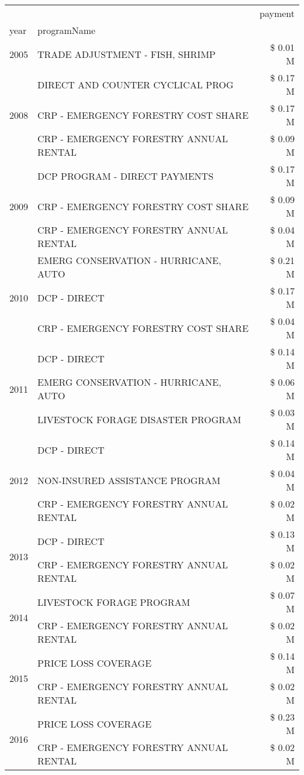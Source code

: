 \begin{tabular}{llr}
\toprule
 &  & payment \\
year & programName &  \\
\midrule
2005 & TRADE ADJUSTMENT - FISH, SHRIMP & \$ 0.01 M \\
\cline{1-3}
\multirow[t]{3}{*}{2008} & DIRECT AND COUNTER CYCLICAL PROG & \$ 0.17 M \\
 & CRP - EMERGENCY FORESTRY COST SHARE & \$ 0.17 M \\
 & CRP - EMERGENCY FORESTRY ANNUAL RENTAL & \$ 0.09 M \\
\cline{1-3}
\multirow[t]{3}{*}{2009} & DCP PROGRAM - DIRECT PAYMENTS & \$ 0.17 M \\
 & CRP - EMERGENCY FORESTRY COST SHARE & \$ 0.09 M \\
 & CRP - EMERGENCY FORESTRY ANNUAL RENTAL & \$ 0.04 M \\
\cline{1-3}
\multirow[t]{3}{*}{2010} & EMERG CONSERVATION - HURRICANE, AUTO & \$ 0.21 M \\
 & DCP - DIRECT & \$ 0.17 M \\
 & CRP - EMERGENCY FORESTRY COST SHARE & \$ 0.04 M \\
\cline{1-3}
\multirow[t]{3}{*}{2011} & DCP - DIRECT & \$ 0.14 M \\
 & EMERG CONSERVATION - HURRICANE, AUTO & \$ 0.06 M \\
 & LIVESTOCK FORAGE DISASTER PROGRAM & \$ 0.03 M \\
\cline{1-3}
\multirow[t]{3}{*}{2012} & DCP - DIRECT & \$ 0.14 M \\
 & NON-INSURED ASSISTANCE PROGRAM & \$ 0.04 M \\
 & CRP - EMERGENCY FORESTRY ANNUAL RENTAL & \$ 0.02 M \\
\cline{1-3}
\multirow[t]{2}{*}{2013} & DCP - DIRECT & \$ 0.13 M \\
 & CRP - EMERGENCY FORESTRY ANNUAL RENTAL & \$ 0.02 M \\
\cline{1-3}
\multirow[t]{2}{*}{2014} & LIVESTOCK FORAGE PROGRAM & \$ 0.07 M \\
 & CRP - EMERGENCY FORESTRY ANNUAL RENTAL & \$ 0.02 M \\
\cline{1-3}
\multirow[t]{2}{*}{2015} & PRICE LOSS COVERAGE & \$ 0.14 M \\
 & CRP - EMERGENCY FORESTRY ANNUAL RENTAL & \$ 0.02 M \\
\cline{1-3}
\multirow[t]{2}{*}{2016} & PRICE LOSS COVERAGE & \$ 0.23 M \\
 & CRP - EMERGENCY FORESTRY ANNUAL RENTAL & \$ 0.02 M \\

\end{tabular}
